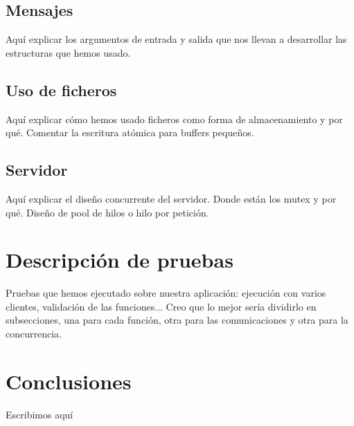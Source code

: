 \documentclass[]{article}
\begin{document}
\subsection{Mensajes}
\label{subsec:mensajes}
Aquí explicar los argumentos de entrada y salida que nos llevan a desarrollar las estructuras que hemos usado.


\subsection{Uso de ficheros}
\label{subsec:uso_de_ficheros}
Aquí explicar cómo hemos usado ficheros como forma de almacenamiento y por qué. Comentar la escritura atómica para buffers pequeños. 


\subsection{Servidor}
\label{subsec:servidor}
Aquí explicar el diseño concurrente del servidor. Donde están los mutex y por qué. Diseño de pool de hilos o hilo por petición. 

\section{Descripción de pruebas}
\label{sec:descripcion_de_pruebas}
Pruebas que hemos ejecutado sobre nuestra aplicación: ejecución con varios clientes, validación de las funciones... Creo que lo mejor sería dividirlo en subsecciones, una para cada función, otra para las comunicaciones y otra para la concurrencia. 



\section{Conclusiones}
\label{sec:conclusiones}
Escribimos aquí
\end{document}
